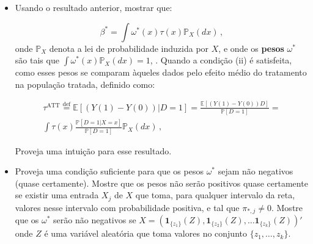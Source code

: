 \documentclass[10pt,a4paper]{article}
\begin{document}
\begin{itemize}
	$$\mathbb{E}[(D-\pi_*'X)Y(0)] = 0 \, .$$
	
	\item[c] Usando o resultado anterior, mostrar que:
	
	$$\beta^* = \int \omega^*(x) \tau(x) \mathbb{P}_X(dx)\, ,$$
	onde $\mathbb{P}_X$ denota a lei de probabilidade induzida por $X$, e onde os \textbf{pesos} $\omega^*$ são tais que $\int \omega^*(x) \mathbb{P}_X(dx)  =  1$, . 	Quando a condição (ii) é satisfeita,  como esses pesos se comparam àqueles dados pelo efeito médio do tratamento na população tratada, definido como:
	
	\begin{equation*}
		\begin{aligned}					\tau^{\text{ATT}}\overset{\text{def}}{=}\mathbb{E}[(Y(1)-Y(0))|D=1] = \frac{\mathbb{E}[(Y(1)-Y(0))D]}{\mathbb{P}[D=1]} = \\ \int \tau(x) \frac{\mathbb{P}[D=1|X=x]}{\mathbb{P}[D=1]} \mathbb{P}_X(dx)\, ,
		\end{aligned}
	\end{equation*}
	
	Proveja uma intuição para esse resultado.
	
	\item[d] Proveja uma condição suficiente para que os pesos $\omega^*$ sejam não negativos (quase certamente). Mostre que os pesos não serão positivos quase certamente se existir uma entrada $X_j$ de $X$ que toma, para qualquer intervalo da reta, valores nesse intervalo com probabilidade positiva, e tal que $\pi_{*,j}\neq 0$. Mostre que os  $\omega^*$ serão não negativos se $X = (\mathbf{1}_{\{z_1\}}(Z), \mathbf{1}_{\{z_2\}}(Z),\ldots \mathbf{1}_{\{z_k\}}(Z))'$ onde $Z$ é uma variável aleatória que toma valores no conjunto $\{z_1,\ldots, z_k\}$.
\end{itemize}



 
\end{document}
